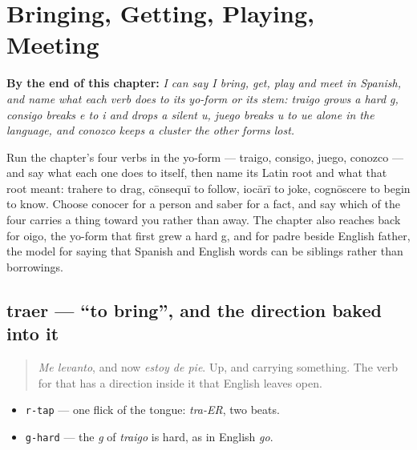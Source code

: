 
\chapter{Bringing, Getting, Playing, Meeting}
\label{ch:spanish-bring-get-play-meet}

\begin{chapteropening}
\textbf{By the end of this chapter:} \emph{I can say I bring, get, play and meet in Spanish, and name what each verb does to its yo-form or its stem: traigo grows a hard g, consigo breaks e to i and drops a silent u, juego breaks u to ue alone in the language, and conozco keeps a cluster the other forms lost.}

Run the chapter's four verbs in the yo-form — traigo, consigo, juego, conozco — and say what each one does to itself, then name its Latin root and what that root meant: trahere to drag, cōnsequī to follow, iocārī to joke, cognōscere to begin to know. Choose conocer for a person and saber for a fact, and say which of the four carries a thing toward you rather than away. The chapter also reaches back for oigo, the yo-form that first grew a hard g, and for padre beside English father, the model for saying that Spanish and English words can be siblings rather than borrowings.
\end{chapteropening}

\section[traer]{traer — \textquotedblleft{}to bring\textquotedblright{}, and the direction baked into it}

\label{lesson:ES-C39-traer}



\begin{quote}
\emph{Me levanto}, and now \emph{estoy de pie}. Up, and carrying something. The verb for that has a direction inside it that English leaves open.
\end{quote}

\begin{sounds}
\begin{itemize}
\raggedright
  \item \texttt{r-tap} — one flick of the tongue: \emph{tra-ER}, two beats.
  \item \texttt{g-hard} — the \emph{g} of \emph{traigo} is hard, as in English \emph{go}.
\end{itemize}
\end{sounds}

